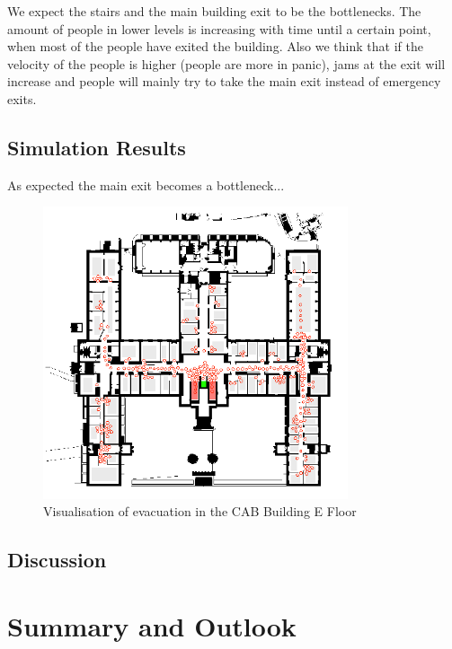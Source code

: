 \documentclass[11pt]{article}
\begin{document}
We expect the stairs and the main building exit to be the bottlenecks. The
amount of people in lower levels is increasing with time until a certain point,
when most of the people have exited the building. Also we think that if the 
velocity of the people is higher (people are more in panic), jams at the
exit will increase and people will mainly try to take the main exit instead of
emergency exits.

\subsection{Simulation Results}

As expected the main exit becomes a bottleneck...

\begin{figure}[h]
\centering
\includegraphics[width=0.8\textwidth]{./images/cab1.png}
\caption{Visualisation of evacuation in the CAB Building E Floor} 
\label{cab1}
\end{figure}




\subsection{Discussion}


\section{Summary and Outlook}
\end{document}
